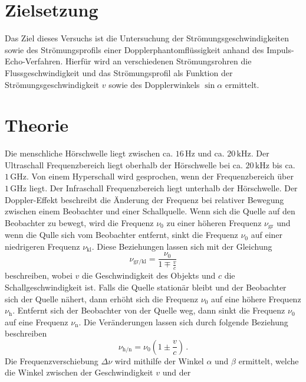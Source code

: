 \section{Zielsetzung}
\label{sec:Zielsetzung}
\nocite{anleitungUS3}
Das Ziel dieses Versuchs ist die Untersuchung der Strömungsgeschwindigkeiten sowie des Strömungsprofils einer Dopplerphantomflüssigkeit anhand des Impuls-Echo-Verfahren.
Hierfür wird an verschiedenen Strömungsrohren die Flussgeschwindigkeit und das Strömungsprofil als Funktion der Strömungsgeschwindigkeit
$v$ sowie des Dopplerwinkels $\sin \alpha$ ermittelt. 
\section{Theorie}
\label{sec:Theorie}
Die menschliche Hörschwelle liegt zwischen ca. $16\,\unit{\hertz}$ und ca. $20\,\unit{\kilo\hertz}$. Der Ultraschall Frequenzbereich
liegt oberhalb der Hörschwelle bei ca. $20\,\unit{\kilo\hertz}$ bis ca. $1\,\unit{\giga\hertz}$. Von einem Hyperschall wird gesprochen, wenn
der Frequenzbereich über $1\,\unit{\giga\hertz}$ liegt. Der Infraschall Frequenzbereich liegt unterhalb der Hörschwelle. 
Der Doppler-Effekt beschreibt die Änderung der Frequenz bei relativer Bewegung zwischen einem Beobachter und einer Schallquelle. 
Wenn sich die Quelle auf den Beobachter zu bewegt, wird die Frequenz $\nu_0$ zu einer höheren Frequenz $\nu_{\text{gr}}$ und wenn die
Qulle sich vom Beobachter entfernt, sinkt die Frequenz $\nu_0$ auf einer niedrigeren Frequenz $\nu_{\text{kl}}$. Diese Beziehungen lassen sich mit
der Gleichung
\begin{equation}
    \nu_{\text{gr/kl}} = \frac{\nu_0}{1 \mp \frac{v}{c}}
    \label{eqn:Frequenz_Quelle-Beobachter}
\end{equation}
beschreiben, wobei $v$ die Geschwindigkeit des Objekts und $c$ die Schallgeschwindigkeit ist. Falls die Quelle stationär bleibt und der Beobachter sich der Quelle nähert, dann erhöht sich die Frequenz $\nu_0$ auf eine höhere Frequenz
$\nu_{\text{h}}$. Entfernt sich der Beobachter von der Quelle weg, dann sinkt die Frequenz $\nu_0$ auf eine Frequenz $\nu_{\text{n}}$. Die Veränderungen lassen sich
durch folgende Beziehung beschreiben 
\begin{equation}
    \nu_{\text{h/n}} = \nu_0 \left( 1 \pm \frac{v}{c}\right)\,.
    \label{eqn:Frequenz_Beobachter-Quelle}
\end{equation}
Die Frequenzverschiebung $\Delta \nu$ wird mithilfe der Winkel $\alpha$ und $\beta$ ermittelt, welche die Winkel zwischen der Geschwindigkeit $v$ und der
